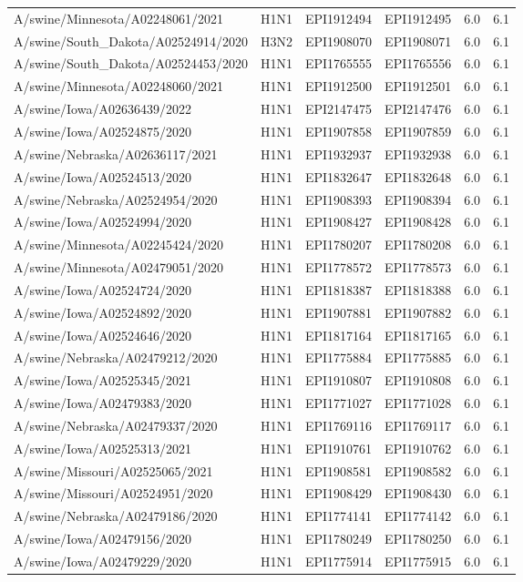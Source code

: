 \begin{tabular}{L{1.2in}|L{.3in}|L{.3in}|L{.3in}|L{.3in}|L{.3in}}
A/swine/Minnesota/A02248061/2021&H1N1&EPI1912494&EPI1912495&6.0&6.1\\
 A/swine/South\_Dakota/A02524914/2020 &H3N2&EPI1908070&EPI1908071&6.0&6.1\\
 A/swine/South\_Dakota/A02524453/2020 &H1N1&EPI1765555&EPI1765556&6.0&6.1\\
A/swine/Minnesota/A02248060/2021&H1N1&EPI1912500&EPI1912501&6.0&6.1\\
A/swine/Iowa/A02636439/2022&H1N1&EPI2147475&EPI2147476&6.0&6.1\\
A/swine/Iowa/A02524875/2020&H1N1&EPI1907858&EPI1907859&6.0&6.1\\
A/swine/Nebraska/A02636117/2021&H1N1&EPI1932937&EPI1932938&6.0&6.1\\
A/swine/Iowa/A02524513/2020&H1N1&EPI1832647&EPI1832648&6.0&6.1\\
A/swine/Nebraska/A02524954/2020&H1N1&EPI1908393&EPI1908394&6.0&6.1\\
A/swine/Iowa/A02524994/2020&H1N1&EPI1908427&EPI1908428&6.0&6.1\\
A/swine/Minnesota/A02245424/2020&H1N1&EPI1780207&EPI1780208&6.0&6.1\\
A/swine/Minnesota/A02479051/2020&H1N1&EPI1778572&EPI1778573&6.0&6.1\\
A/swine/Iowa/A02524724/2020&H1N1&EPI1818387&EPI1818388&6.0&6.1\\
A/swine/Iowa/A02524892/2020&H1N1&EPI1907881&EPI1907882&6.0&6.1\\
A/swine/Iowa/A02524646/2020&H1N1&EPI1817164&EPI1817165&6.0&6.1\\
A/swine/Nebraska/A02479212/2020&H1N1&EPI1775884&EPI1775885&6.0&6.1\\
A/swine/Iowa/A02525345/2021&H1N1&EPI1910807&EPI1910808&6.0&6.1\\
A/swine/Iowa/A02479383/2020&H1N1&EPI1771027&EPI1771028&6.0&6.1\\
A/swine/Nebraska/A02479337/2020&H1N1&EPI1769116&EPI1769117&6.0&6.1\\
A/swine/Iowa/A02525313/2021&H1N1&EPI1910761&EPI1910762&6.0&6.1\\
A/swine/Missouri/A02525065/2021&H1N1&EPI1908581&EPI1908582&6.0&6.1\\
A/swine/Missouri/A02524951/2020&H1N1&EPI1908429&EPI1908430&6.0&6.1\\
A/swine/Nebraska/A02479186/2020&H1N1&EPI1774141&EPI1774142&6.0&6.1\\
A/swine/Iowa/A02479156/2020&H1N1&EPI1780249&EPI1780250&6.0&6.1\\
A/swine/Iowa/A02479229/2020&H1N1&EPI1775914&EPI1775915&6.0&6.1\\

\end{tabular}
